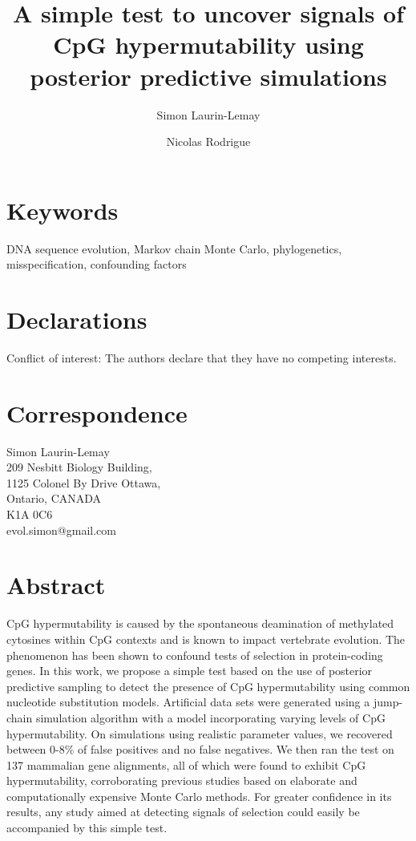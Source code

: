 \documentclass{article}
\begin{document}
\title{A simple test to uncover signals of CpG hypermutability using posterior predictive simulations}
\author[1]{Simon Laurin-Lemay}
\author[1,2,3]{Nicolas Rodrigue}
\date{}
\maketitle
\section*{Keywords}
DNA sequence evolution, Markov chain Monte Carlo, phylogenetics, misspecification, confounding factors
\section*{Declarations}
Conflict of interest: The authors declare that they have no competing
interests.
\section*{Correspondence}
Simon Laurin-Lemay\\
209 Nesbitt Biology Building,\\
1125 Colonel By Drive Ottawa,\\
Ontario, CANADA\\
K1A 0C6\\
evol.simon@gmail.com\\
\clearpage
\doublespacing

\section*{Abstract}
CpG hypermutability is caused by the spontaneous deamination of methylated cytosines within CpG contexts and is known to impact vertebrate evolution.  The phenomenon has been shown to confound tests of selection in protein-coding genes.  In this work, we propose a simple test based on the use of posterior predictive sampling to detect the presence of CpG hypermutability using common nucleotide substitution models.  Artificial data sets were generated using a jump-chain simulation algorithm with a model incorporating varying levels of CpG hypermutability.  On simulations using realistic parameter values, we recovered between 0-8\% of false positives and no false negatives.  We then ran the test on 137 mammalian gene alignments, all of which were found to exhibit CpG hypermutability, corroborating previous studies based on elaborate and computationally expensive Monte Carlo methods.  For greater confidence in its results, any study aimed at detecting signals of selection could easily be accompanied by this simple test.
\end{document}
